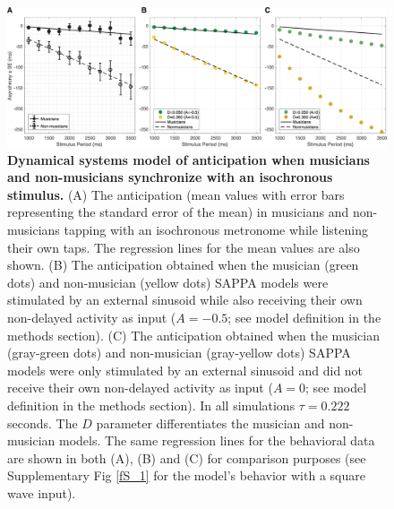 \documentclass{report}
\begin{document}
\begin{figure}
    \centering
    \includegraphics[width=1.0\textwidth]{figures/fig2_2.png}
    \caption[Dynamical systems model of anticipation when musicians and non-musicians synchronize with an isochronous stimulus]{\textbf{Dynamical systems model of anticipation when musicians and non-musicians synchronize with an isochronous stimulus.} (A) The anticipation (mean values with error bars representing the standard error of the mean) in musicians and non-musicians tapping with an isochronous metronome while listening their own taps. The regression lines for the mean values are also shown. (B) The anticipation obtained when the musician (green dots) and non-musician (yellow dots) SAPPA models were stimulated by an external sinusoid while also receiving their own non-delayed activity as input ($A = -0.5$; see model definition in the methods section). (C) The anticipation obtained when the musician (gray-green dots) and non-musician (gray-yellow dots) SAPPA models were only stimulated by an external sinusoid and did not receive their own non-delayed activity as input ($A = 0$; see model definition in the methods section). In all simulations $\tau = 0.222$ seconds. The $D$ parameter differentiates the musician and non-musician models. The same regression lines for the behavioral data are shown in both (A), (B) and (C) for comparison purposes (see Supplementary Fig \ref{fS_1} for the model’s behavior with a square wave input).}
    \label{f2_2}
\end{figure}
\end{document}
